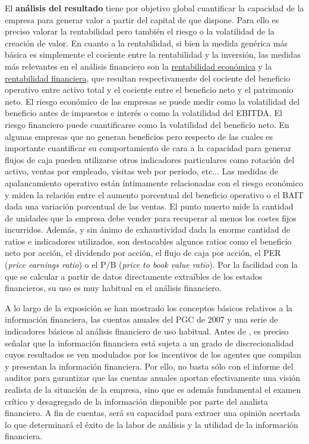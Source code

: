 \documentclass{nuevotema}
\begin{document}
El \textbf{análisis del resultado} tiene por objetivo global cuantificar la capacidad de la empresa para generar valor a partir del capital de que dispone. Para ello es preciso valorar la rentabilidad pero también el riesgo o la volatilidad de la creación de valor. En cuanto a la rentabilidad, si bien la medida genérica más básica es simplemente el cociente entre la rentabilidad y la inversión, las medidas más relevantes en el análisis financiero son la \underline{rentabilidad económica} y la \underline{rentabilidad financiera}, que resultan respectivamente del cociente del beneficio operativo entre activo total y el cociente entre el beneficio neto y el patrimonio neto. El riesgo económico de las empresas se puede medir como la volatilidad del beneficio antes de impuestos e interés o como la volatilidad del EBITDA. El riesgo financiero puede cuantificarse como la volatilidad del beneficio neto. En algunas empresas que no generan beneficios pero respecto de las cuales es importante cuantificar su comportamiento de cara a la capacidad para generar flujos de caja pueden utilizarse otros indicadores particulares como rotación del activo, ventas por empleado, visitas web por periodo, etc... Las medidas de apalancamiento operativo están íntimamente relacionadas con el riesgo económico y miden la relación entre el aumento porcentual del beneficio operativo o el BAIT dada una variación porcentual de las ventas. El punto muerto mide la cantidad de unidades que la empresa debe vender para recuperar al menos los costes fijos incurridos. Además, y sin ánimo de exhaustividad dada la enorme cantidad de ratios e indicadores utilizados, son destacables algunos ratios como el beneficio neto por acción, el dividendo por acción, el flujo de caja por acción, el PER (\textit{price earnings ratio}) o el P/B (\textit{price to book value ratio}). Por la facilidad con la que se calcular a partir de datos directamente extraíbles de los estados financieros, su uso es muy habitual en el análisis financiero.

A lo largo de la exposición se han mostrado los conceptos básicos relativos a la información financiera, las cuentas anuales del PGC de 2007 y una serie de indicadores básicos al análisis financiero de uso habitual. Antes de , es preciso señalar que la información financiera está sujeta a un grado de discrecionalidad cuyos resultados se ven modulados por los incentivos de los agentes que compilan y presentan la información financiera. Por ello, no basta sólo con el informe del auditor para garantizar que las cuentas anuales aportan efectivamente una visión realista de la situación de la empresa, sino que es además fundamental el examen crítico y desagregado de la información disponible por parte del analista financiero. A fin de cuentas, será su capacidad para extraer una opinión acertada lo que determinará el éxito de la labor de análisis y la utilidad de la información financiera.
\end{document}
